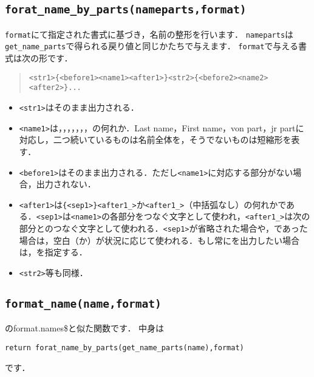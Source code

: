 \documentclass[a4paper]{ltjsarticle}
\newcommand{\luafunc}[1]{\texttt{#1}}
\newcommand*{\luavar}[1]{\texttt{#1}}
\begin{document}
\subsection{\luafunc{forat\_name\_by\_parts(nameparts,format)}}
\luavar{format}にて指定された書式に基づき，名前の整形を行います．
\luavar{nameparts}は\luafunc{get\_name\_parts}で得られる戻り値と同じかたちで与えます．
\luavar{format}で与える書式は次の形です．
\begin{quote}
\begin{verbatim}
<str1>{<before1><name1><after1>}<str2>{<before2><name2><after2>}...
\end{verbatim}
\end{quote}
\begin{itemize}
\item \verb|<str1>|はそのまま出力される．
\item \verb|<name1>|は，，，，，，，の何れか．Last name，First name，von part，jr partに対応し，二つ続いているものは名前全体を，そうでないものは短縮形を表す．
\item \verb|<before1>|はそのまま出力される．ただし\verb|<name1>|に対応する部分がない場合，出力されない．
\item \verb|<after1>|は\verb|{<sep1>}<after1_>|か\verb|<after1_>|（中括弧なし）の何れかである．\verb|<sep1>|は\verb|<name1>|の各部分をつなぐ文字として使われ，\verb|<after1_>|は次の部分とのつなぐ文字として使われる．\verb|<sep1>|が省略された場合や，\luastring{~}であった場合は，空白（\luastring{ }か\luastring{~}）が状況に応じて使われる．もし常に\luastring{~}を出力したい場合は，\luastring{~~}を指定する．
\item \verb|<str2>|等も同様．
\end{itemize}

\subsection{\luafunc{format\_name(name,format)}}
\BibTeX のformat.names\$と似た関数です．
中身は
\begin{lstlisting}
return forat_name_by_parts(get_name_parts(name),format)
\end{lstlisting}
です．
\end{document}
